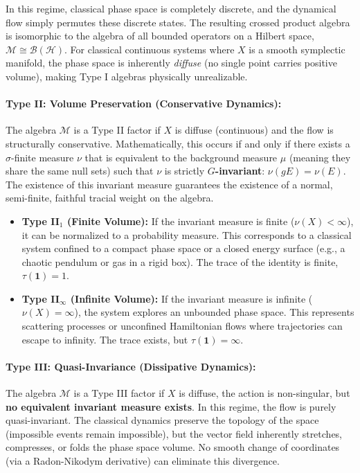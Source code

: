\documentclass[a4paper,11pt]{article}
\theoremstyle{definition}
\begin{document}
In this regime, classical phase space is completely discrete, and the dynamical flow simply permutes these discrete states. The resulting crossed product algebra is isomorphic to the algebra of all bounded operators on a Hilbert space, $\mathcal{M} \cong \mathcal{B}(\mathcal{H})$. For classical continuous systems where $X$ is a smooth symplectic manifold, the phase space is inherently \textit{diffuse} (no single point carries positive volume), making Type I algebras physically unrealizable.

\paragraph{Type II: Volume Preservation (Conservative Dynamics):}
The algebra $\mathcal{M}$ is a Type II factor if $X$ is diffuse (continuous) and the flow is structurally conservative. Mathematically, this occurs if and only if there exists a $\sigma$-finite measure $\nu$ that is equivalent to the background measure $\mu$ (meaning they share the same null sets) such that $\nu$ is strictly \textbf{$G$-invariant}: $\nu(gE) = \nu(E)$. The existence of this invariant measure guarantees the existence of a normal, semi-finite, faithful tracial weight on the algebra. 
\begin{itemize}
    \item \textbf{Type II$_1$ (Finite Volume):} If the invariant measure is finite ($\nu(X) < \infty$), it can be normalized to a probability measure. This corresponds to a classical system confined to a compact phase space or a closed energy surface (e.g., a chaotic pendulum or gas in a rigid box). The trace of the identity is finite, $\tau(\mathbf{1}) = 1$.
    \item \textbf{Type II$_\infty$ (Infinite Volume):} If the invariant measure is infinite ($\nu(X) = \infty$), the system explores an unbounded phase space. This represents scattering processes or unconfined Hamiltonian flows where trajectories can escape to infinity. The trace exists, but $\tau(\mathbf{1}) = \infty$.
\end{itemize}

\paragraph{Type III: Quasi-Invariance (Dissipative Dynamics):}
The algebra $\mathcal{M}$ is a Type III factor if $X$ is diffuse, the action is non-singular, but \textbf{no equivalent invariant measure exists}. In this regime, the flow is purely quasi-invariant. The classical dynamics preserve the topology of the space (impossible events remain impossible), but the vector field inherently stretches, compresses, or folds the phase space volume. No smooth change of coordinates (via a Radon-Nikodym derivative) can eliminate this divergence. 
\end{document}
